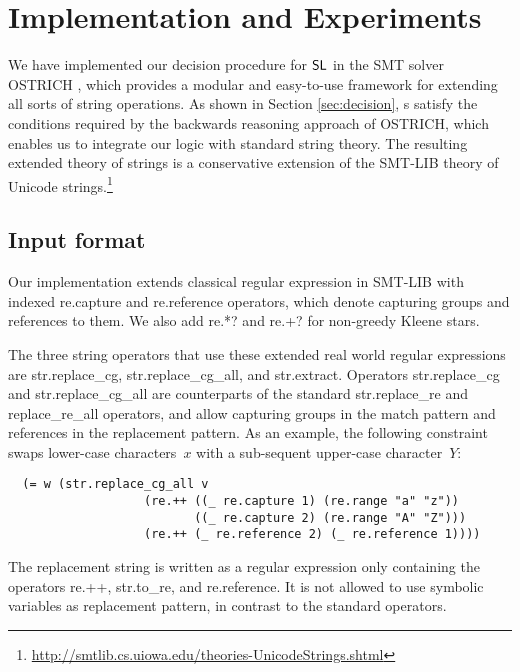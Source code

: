 
\section{Implementation and Experiments}
\label{sect:impl}

We have implemented our decision procedure for $\mathsf{SL}$ in the SMT
solver OSTRICH \cite{CHL+19}, which provides a modular and easy-to-use
framework for extending all sorts of string operations. As shown in
Section \ref{sec:decision}, \PSST s satisfy the conditions required by
the backwards reasoning approach of OSTRICH, which enables us to
integrate our logic with standard string theory. The resulting
extended theory of strings is a conservative extension of the SMT-LIB
theory of Unicode strings.\footnote{\url{http://smtlib.cs.uiowa.edu/theories-UnicodeStrings.shtml}}

\subsection{Input format}

Our implementation extends classical regular expression in SMT-LIB
with indexed {\sf re.capture} and {\sf re.reference} operators, which
denote capturing groups and references to them. We also add {\sf re.*?}
and {\sf re.+?} for non-greedy Kleene stars.

The three string operators that use these extended real world regular
expressions are {\sf str.replace\_cg}, {\sf str.replace\_cg\_all}, and
{\sf str.extract}. Operators {\sf str.replace\_cg} and {\sf
  str.replace\_cg\_all} are counterparts of the standard {\sf
  str.replace\_re} and {\sf replace\_re\_all} operators, and allow
capturing groups in the match pattern and references in the
replacement pattern. As an example, the following constraint swaps
lower-case characters~$x$ with a sub-sequent upper-case character~$Y$:
%
\begin{verbatim}
  (= w (str.replace_cg_all v
                   (re.++ ((_ re.capture 1) (re.range "a" "z"))
                          ((_ re.capture 2) (re.range "A" "Z")))
                   (re.++ (_ re.reference 2) (_ re.reference 1))))
\end{verbatim}
%
The replacement string is written as a regular expression only
containing the operators {\sf re.++}, {\sf str.to\_re}, and {\sf
  re.reference}. It is not allowed to use symbolic variables as
replacement pattern, in contrast to the standard operators.

